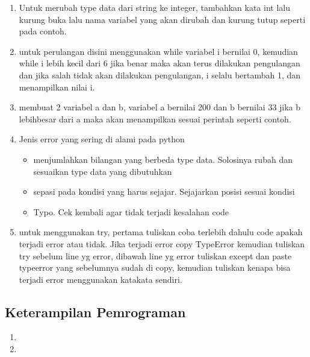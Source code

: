 \begin{enumerate}
\begin{enumerate}
	\item Untuk merubah type data dari string ke integer, tambahkan kata int lalu kurung buka lalu nama variabel yang akan dirubah dan kurung tutup seperti pada contoh.
	
	
	\item untuk perulangan disini menggunakan while variabel i bernilai 0, kemudian while i lebih kecil dari 6 jika benar maka akan terus dilakukan pengulangan dan jika salah tidak akan dilakukan pengulangan, i selalu bertambah 1, dan menampilkan nilai i. 
	
	
	\item membuat 2 variabel a dan b, variabel a bernilai 200 dan b bernilai 33 jika b lebihbesar dari a maka akan menampilkan sesuai perintah seperti contoh.
	
	
	\item Jenis error yang sering di alami pada python
	\begin{itemize}
	    \item menjumlahkan bilangan yang berbeda type data. Solosinya rubah dan sesuaikan type data yang dibutuhkan
	    \item sepasi pada kondisi yang harus sejajar. Sejajarkan posisi sesuai kondisi
	    \item Typo. Cek kembali agar tidak terjadi kesalahan code
	\end{itemize}
	
	\item untuk menggunakan try, pertama tuliskan coba terlebih dahulu code apakah terjadi error atau tidak. Jika terjadi error copy TypeError kemudian tuliskan try sebelum line yg error, dibawah line yg error tuliskan except dan paste typeerror yang sebelumnya sudah di copy, kemudian tuliskan kenapa bisa terjadi error menggunakan katakata sendiri.
	
\end{enumerate}

\subsection{Keterampilan Pemrograman}
\begin{enumerate}
    \item 
    
    \item 
    

\end{enumerate}
\end{enumerate}
